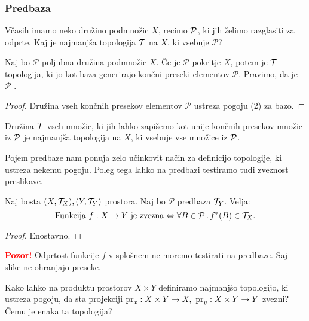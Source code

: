 \subsubsection{Predbaza}

Včasih imamo neko družino podmnožic $X$, recimo $\mathcal{P}$, ki jih želimo razglasiti za odprte. Kaj je najmanjša topologija $\mathcal{T}$ na $X$, ki vsebuje $\mathcal{P}$?

\begin{trditev}
    Naj bo $\mathcal{P}$ poljubna družina podmnožic $X$. Če je $\mathcal{P}$ pokritje $X$, potem je $\mathcal{T}$ topologija, ki jo kot baza generirajo končni preseki elementov $\mathcal{P}$.
    Pravimo, da je $\mathcal{P}$ .
\end{trditev}

\begin{proof}
    Družina vseh končnih presekov elementov $\mathcal{P}$ ustreza pogoju (2) za bazo.
\end{proof}

\begin{opomba}
    Družina $\mathcal{T}$ vseh množic, ki jih lahko zapišemo kot unije končnih presekov množic iz $\mathcal{P}$ je najmanjša topologija na $X$, ki vsebuje vse množice iz $\mathcal{P}$.
\end{opomba}

Pojem predbaze nam ponuja zelo učinkovit način za definicijo topologije, ki ustreza nekemu pogoju. Poleg tega lahko na predbazi testiramo tudi zveznost preslikave.

\begin{trditev}
    Naj bosta $(X, \mathcal{T}_X), (Y, \mathcal{T}_Y)$ prostora. Naj bo $\mathcal{P}$ predbaza $\mathcal{T}_Y$. Velja:
    $$\text{Funkcija } f: X \to Y \text{ je zvezna} \Leftrightarrow \forall B \in \mathcal{P} \,.\, f^{*}(B) \in \mathcal{T}_X.$$
\end{trditev}

\begin{proof}
    Enostavno.
\end{proof}


\textbf{\textcolor{red}{Pozor!}} Odprtost funkcije $f$ v splošnem ne moremo testirati na predbaze. Saj slike ne ohranjajo preseke.

\begin{primer}
    Kako lahko na produktu prostorov $X \times Y$ definiramo najmanjšo topologijo, ki ustreza pogoju, da sta projekciji $\operatorname{pr}_x: X \times Y \to X, \ \operatorname{pr}_y: X \times Y \to Y$ zvezni? Čemu je enaka ta topologija?
\end{primer}

